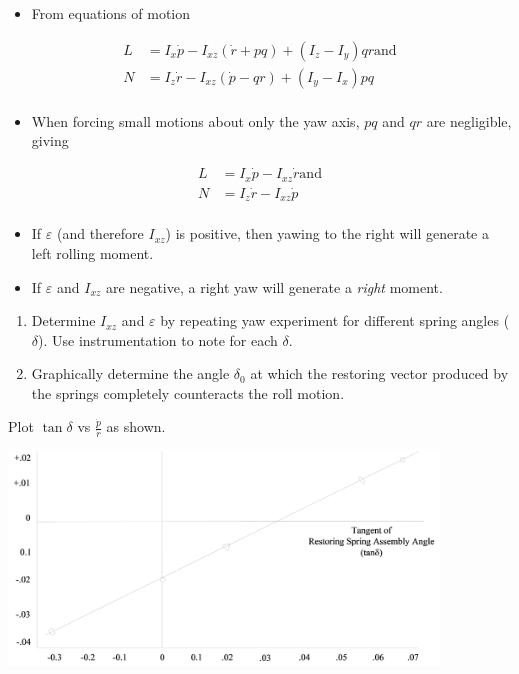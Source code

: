 \documentclass[
]{book}
\providecommand{\tightlist}{%
  \setlength{\itemsep}{0pt}\setlength{\parskip}{0pt}}
\begin{document}
\begin{itemize}
\tightlist
\item
  From equations of motion
\end{itemize}

\[ 
\begin{align}
L &= I_x \dot{p} - I_{xz} \left( \dot{r} + pq \right) + \left( I_z - I_y \right) qr \text{and} \\
N &= I_z \dot{r} - I_{xz} \left( \dot{p} - qr \right) + \left( I_y - I_x \right) pq \\
\end{align}
\]

\begin{itemize}
\tightlist
\item
  When forcing small motions about only the yaw axis, \(pq\) and \(qr\) are negligible, giving
\end{itemize}

\[ 
\begin{align}
L &= I_x \dot{p} - I_{xz} \dot{r} \text{and} \\
N &=  I_z \dot{r} - I_{xz} \dot{p} \\
\end{align}
\]

\begin{itemize}
\tightlist
\item
  If \(\varepsilon\) (and therefore \(I_{xz}\)) is positive, then yawing to the right will generate a left rolling moment.
\item
  If \(\varepsilon\) and \(I_{xz}\) are negative, a right yaw will generate a \emph{right} moment.
\end{itemize}

\begin{enumerate}
\def\labelenumi{\arabic{enumi}.}
\tightlist
\item
  Determine \(I_{xz}\) and \(\varepsilon\) by repeating yaw experiment for different spring angles (\(\delta\)). Use instrumentation to note for each \(\delta\).
\item
  Graphically determine the angle \(\delta_0\) at which the restoring vector produced by the springs completely counteracts the roll motion.
\end{enumerate}

Plot \(\tan{\delta}\) vs \(\frac{\dot{p}}{\dot{r}}\) as shown.
\includegraphics[width=4.5in,height=2.5in]{media/07/image47.svg}
\end{document}
